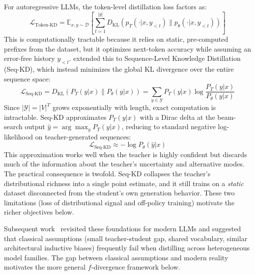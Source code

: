 \documentclass{article} %
\newcommand{\E}{\mathbb{E}}
\newcommand{\KL}{D_{\mathrm{KL}}}
\newcommand{\ptheta}{p_\theta}
\newcommand{\pteacher}{p_T}
\newcommand{\loss}{\mathcal{L}}
\begin{document}
For autoregressive LLMs, the token-level distillation loss factors as:
\begin{equation}
    \loss_{\text{Token-KD}} = \E_{x, y \sim \mathcal{D}} \left[ \sum_{t=1}^{|y|} \KL(\pteacher(\cdot | x, y_{<t}) \parallel \ptheta(\cdot | x, y_{<t})) \right]
\label{eq:token_kd}
\end{equation}
This is computationally tractable because it relies on static, pre-computed prefixes from the dataset, but it optimizes next-token accuracy while assuming an error-free history $y_{<t}$. \citet{1606.07947} extended this to Sequence-Level Knowledge Distillation (Seq-KD), which instead minimizes the global KL divergence over the entire sequence space:
\begin{equation*}
    \loss_{\text{Seq-KD}} = \KL(P_T(y|x) \parallel P_\theta(y|x)) = \sum_{y \in \mathcal{Y}} P_T(y|x) \log \frac{P_T(y|x)}{P_\theta(y|x)}
\end{equation*}
Since $|\mathcal{Y}| = |V|^T$ grows exponentially with length, exact computation is intractable. Seq-KD approximates $P_T(y|x)$ with a Dirac delta at the beam-search output $\hat{y} = \arg\max_y P_T(y|x)$, reducing to standard negative log-likelihood on teacher-generated sequences:
\begin{equation*}
    \loss_{\text{Seq-KD}} \approx -\log P_\theta(\hat{y}|x)
\end{equation*}
This approximation works well when the teacher is highly confident but discards much of the information about the teacher's uncertainty and alternative modes. The practical consequence is twofold. Seq-KD collapses the teacher's distributional richness into a single point estimate, and it still trains on a \emph{static} dataset disconnected from the student's own generation behavior. These two limitations (loss of distributional signal and off-policy training) motivate the richer objectives below.

Subsequent work~\citep{2402.11890} revisited these foundations for modern LLMs and suggested that classical assumptions (small teacher-student gap, shared vocabulary, similar architectural inductive biases) frequently fail when distilling across heterogeneous model families. The gap between classical assumptions and modern reality motivates the more general $f$-divergence framework below.
\end{document}
